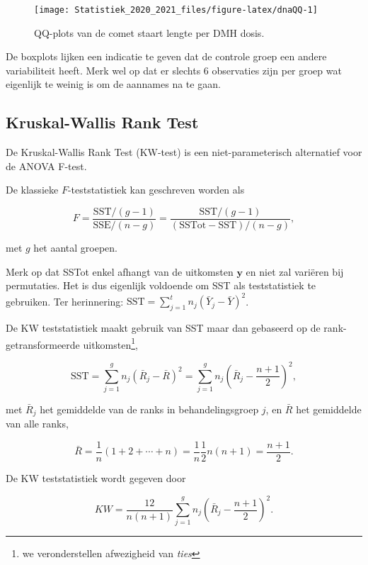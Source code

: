 \documentclass[
  12pt,dutch,coursenotes]{book}
\theoremstyle{definition}
\theoremstyle{definition}
\theoremstyle{definition}
\theoremstyle{remark}
\begin{document}
\begin{figure}

{\centering \texttt{[image: Statistiek\_2020\_2021\_files/figure-latex/dnaQQ-1]} 

}

\caption{QQ-plots van de comet staart lengte per DMH dosis.}\label{fig:dnaQQ}
\end{figure}

De boxplots lijken een indicatie te geven dat de controle groep een andere variabiliteit heeft.
Merk wel op dat er slechts 6 observaties zijn per groep wat eigenlijk te weinig is om de aannames na te gaan.

\hypertarget{kruskal-wallis-rank-test}{%
\subsection{Kruskal-Wallis Rank Test}\label{kruskal-wallis-rank-test}}

De Kruskal-Wallis Rank Test (KW-test) is een niet-parameterisch alternatief voor de ANOVA F-test.

De klassieke \(F\)-teststatistiek kan geschreven worden als

\[
    F = \frac{\text{SST}/(g-1)}{\text{SSE}/(n-g)} = \frac{\text{SST}/(g-1)}{(\text{SSTot}-\text{SST})/(n-g)} ,
  \]

met \(g\) het aantal groepen.

Merk op dat SSTot enkel afhangt van de uitkomsten \(\mathbf{y}\) en niet zal variëren bij permutaties. Het is dus eigenlijk voldoende om SST als teststatistiek te gebruiken. Ter herinnering: \(\text{SST}=\sum_{j=1}^t n_j(\bar{Y}_j-\bar{Y})^2\).

De KW teststatistiek maakt gebruik van SST maar dan gebaseerd op de rank-getransformeerde uitkomsten\footnote{we veronderstellen afwezigheid van \emph{ties}},

\[
     \text{SST} = \sum_{j=1}^g n_j \left(\bar{R}_j - \bar{R}\right)^2 = \sum_{j=1}^g n_j \left(\bar{R}_j - \frac{n+1}{2}\right)^2 ,
  \]

met \(\bar{R}_j\) het gemiddelde van de ranks in behandelingsgroep \(j\), en \(\bar{R}\) het gemiddelde van alle ranks,

\[
    \bar{R} = \frac{1}{n}(1+2+\cdots + n) = \frac{1}{n}\frac{1}{2}n(n+1) = \frac{n+1}{2}.
  \]

De KW teststatistiek wordt gegeven door

\[
    KW = \frac{12}{n(n+1)}  \sum_{j=1}^g n_j \left(\bar{R}_j - \frac{n+1}{2}\right)^2.
  \]
\end{document}
